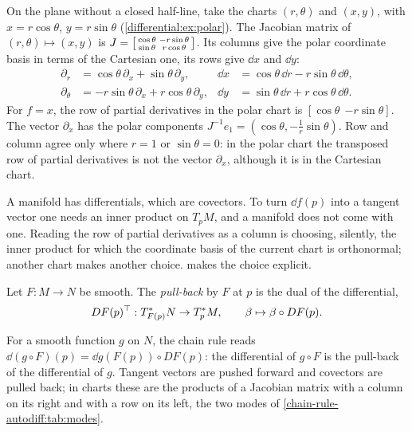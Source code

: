 \begin{notechapter}
\begin{example}\label{tangent-bundles:ex:polar}
On the plane without a closed half-line, take the charts $(r, \theta)$
and $(x, y)$, with $x = r\cos\theta$, $y = r\sin\theta$
(\cref{differential:ex:polar}). The Jacobian matrix of
$(r, \theta)\mapsto(x, y)$ is
$J = \begin{bsmallmatrix}\cos\theta & -r\sin\theta\\
\sin\theta & r\cos\theta\end{bsmallmatrix}$. Its columns give the polar
coordinate basis in terms of the Cartesian one, its rows give $\dd x$ and
$\dd y$:
\begin{align*}
  \partial_r &= \cos\theta\,\partial_x + \sin\theta\,\partial_y , &
  \dd x &= \cos\theta\,\dd r - r\sin\theta\,\dd\theta , \\
  \partial_\theta &= -r\sin\theta\,\partial_x + r\cos\theta\,\partial_y , &
  \dd y &= \sin\theta\,\dd r + r\cos\theta\,\dd\theta .
\end{align*}
For $f = x$, the row of partial derivatives in the polar chart is
$[\cos\theta\ \ {-r\sin\theta}]$. The vector $\partial_x$ has the polar
components $J^{-1}e_1 = (\cos\theta, -\frac1r\sin\theta)$. Row and column
agree only where $r = 1$ or $\sin\theta = 0$: in the polar chart the
transposed row of partial derivatives is not the vector $\partial_x$,
although it is in the Cartesian chart.
\end{example}

\begin{pitfall}
A manifold has differentials, which are covectors. To turn $\dd f(p)$
into a tangent vector one needs an inner product on $T_pM$, and a
manifold does not come with one. Reading the row of partial derivatives
as a column is choosing, silently, the inner product for which the
coordinate basis of the current chart is orthonormal; another chart makes
another choice.  makes the choice
explicit.
\end{pitfall}

\begin{definition}\label{tangent-bundles:def:pullback}
Let $F:M\to N$ be smooth. The \emph{pull-back} by $F$ at $p$ is the dual
of the differential,
\[
  DF(p)^{\top}:T_{F(p)}^*N\to T_p^*M , \qquad
  \beta\mapsto\beta\circ DF(p) .
\]
\end{definition}

For a smooth function $g$ on $N$, the chain rule reads
$\dd(g\circ F)(p) = \dd g(F(p))\circ DF(p)$: the differential of
$g\circ F$ is the pull-back of the differential of $g$. Tangent vectors
are pushed forward and covectors are pulled back; in charts these are the
products of a Jacobian matrix with a column on its right and with a row
on its left, the two modes of \cref{chain-rule-autodiff:tab:modes}.


\end{notechapter}
